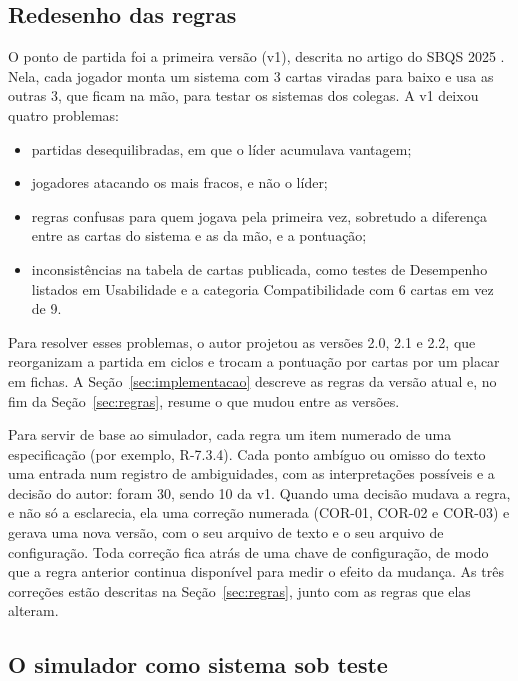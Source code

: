 \subsection{Redesenho das regras}

O ponto de partida foi a primeira versão (v1), descrita no artigo do SBQS 2025 \cite{oliveira2025critical}. Nela,
cada jogador monta um sistema com 3 cartas viradas para baixo e usa as outras 3, que ficam na mão, para testar os
sistemas dos colegas. A v1 deixou quatro problemas:
\begin{itemize}
  \item partidas desequilibradas, em que o líder acumulava vantagem;
  \item jogadores atacando os mais fracos, e não o líder;
  \item regras confusas para quem jogava pela primeira vez, sobretudo a diferença entre as cartas do sistema e
    as da mão, e a pontuação;
  \item inconsistências na tabela de cartas publicada, como testes de Desempenho listados em Usabilidade e a
    categoria Compatibilidade com 6 cartas em vez de 9.
\end{itemize}

Para resolver esses problemas, o autor projetou as versões 2.0, 2.1 e 2.2, que reorganizam a partida em ciclos
e trocam a pontuação por cartas por um placar em fichas. A Seção~\ref{sec:implementacao} descreve as regras da
versão atual e, no fim da Seção~\ref{sec:regras}, resume o que mudou entre as versões.

Para servir de base ao simulador, cada regra  um item numerado de uma especificação
(por exemplo, R-7.3.4). Cada ponto ambíguo ou omisso do texto  uma entrada num registro de
ambiguidades, com as interpretações possíveis e a decisão do autor: foram 30, sendo 10 da v1. Quando uma decisão
mudava a regra, e não só a esclarecia, ela  uma correção numerada (COR-01, COR-02 e
COR-03) e gerava uma nova versão, com o seu
arquivo de texto e o seu arquivo de configuração. Toda correção fica atrás de uma chave de configuração, de modo
que a regra anterior continua disponível para medir o efeito da mudança. As três correções estão descritas na
Seção~\ref{sec:regras}, junto com as regras que elas alteram.

\subsection{O simulador como sistema sob teste}

